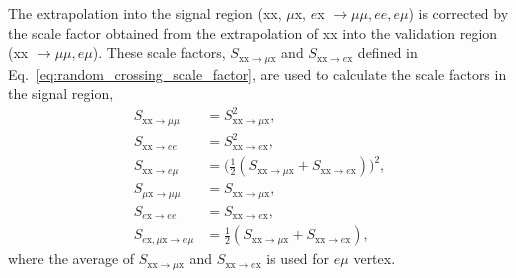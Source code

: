 The extrapolation into the signal region (xx, $\mu$x, $e$x $\rightarrow \mu\mu, ee, e\mu$) is corrected by the scale factor obtained from the extrapolation of xx into the validation region (xx $\rightarrow \mu\mu, e\mu$). These scale factors, $S_{\mathrm{xx} \rightarrow \mu \mathrm{x}}$ and $S_{\mathrm{xx} \rightarrow e \mathrm{x}}$ defined in Eq.~\ref{eq:random_crossing_scale_factor}, are used to calculate the scale factors in the signal region,
\begin{align}
\label{eq:TF_scale_factors}
S_{\mathrm{xx} \rightarrow \mu\mu} &=  S_{\mathrm{xx} \rightarrow \mu \mathrm{x}}^{2},  \nonumber\\
S_{\mathrm{xx} \rightarrow ee} &= S_{\mathrm{xx} \rightarrow e\mathrm{x}}^{2},  \nonumber\\
S_{\mathrm{xx} \rightarrow e\mu} &= \Big(\frac{1}{2} (S_{\mathrm{xx} \rightarrow \mu \mathrm{x}} + S_{\mathrm{xx} \rightarrow e\mathrm{x}})\Big)^{2}, \nonumber\\
S_{\mu \mathrm{x} \rightarrow \mu\mu} &=  S_{\mathrm{xx} \rightarrow \mu \mathrm{x}},  \nonumber\\
S_{e \mathrm{x} \rightarrow ee} &= S_{\mathrm{xx} \rightarrow e\mathrm{x}},  \nonumber\\
S_{e \mathrm{x}, \mu \mathrm{x} \rightarrow e\mu} &= \frac{1}{2} (S_{\mathrm{xx} \rightarrow \mu \mathrm{x}} + S_{\mathrm{xx} \rightarrow e\mathrm{x}}),
\end{align}
where the average of $S_{\mathrm{xx} \rightarrow \mu \mathrm{x}}$ and $S_{\mathrm{xx} \rightarrow e \mathrm{x}}$ is used for $e \mu$ vertex.




